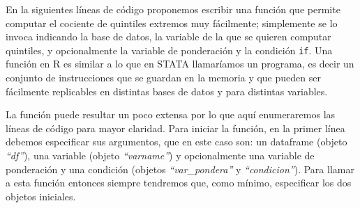\documentclass[
]{book}
\begin{document}
En la siguientes líneas de código proponemos escribir una función que permite computar el cociente de quintiles extremos muy fácilmente; simplemente se lo invoca indicando la base de datos, la variable de la que se quieren computar quintiles, y opcionalmente la variable de ponderación y la condición \texttt{if}. Una función en R es similar a lo que en STATA llamaríamos un programa, es decir un conjunto de instrucciones que se guardan en la memoria y que pueden ser fácilmente replicables en distintas bases de datos y para distintas variables.

La función puede resultar un poco extensa por lo que aquí enumeraremos las líneas de código para mayor claridad. Para iniciar la función, en la primer línea debemos especificar sus argumentos, que en este caso son: un dataframe (objeto \emph{``df''}), una variable (objeto \emph{``varname''}) y opcionalmente una variable de ponderación y una condición (objetos \emph{``var\_pondera''} y \emph{``condicion''}). Para llamar a esta función entonces siempre tendremos que, como mínimo, especificar los dos objetos iniciales.
\end{document}
